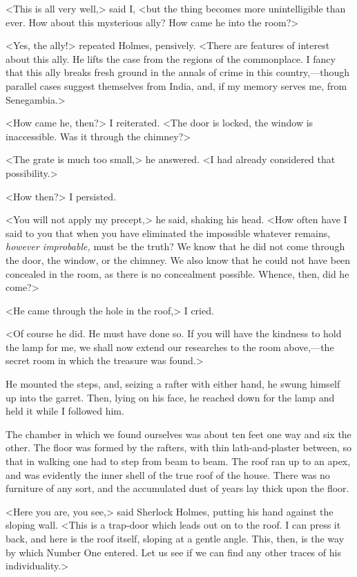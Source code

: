 <This is all very well,> said I, <but the thing becomes more unintelligible than ever. How about this mysterious ally? How came he into the room?>

<Yes, the ally!> repeated Holmes, pensively. <There are features of interest about this ally. He lifts the case from the regions of the commonplace. I fancy that this ally breaks fresh ground in the annals of crime in this country,—though parallel cases suggest themselves from India, and, if my memory serves me, from Senegambia.>

<How came he, then?> I reiterated. <The door is locked, the window is inaccessible. Was it through the chimney?>

<The grate is much too small,> he answered. <I had already considered that possibility.>

<How then?> I persisted.

<You will not apply my precept,> he said, shaking his head. <How often have I said to you that when you have eliminated the impossible whatever remains, \textit{however improbable,} must be the truth? We know that he did not come through the door, the window, or the chimney. We also know that he could not have been concealed in the room, as there is no concealment possible. Whence, then, did he come?>

<He came through the hole in the roof,> I cried.

<Of course he did. He must have done so. If you will have the kindness to hold the lamp for me, we shall now extend our researches to the room above,—the secret room in which the treasure was found.>

He mounted the steps, and, seizing a rafter with either hand, he swung himself up into the garret. Then, lying on his face, he reached down for the lamp and held it while I followed him.

The chamber in which we found ourselves was about ten feet one way and six the other. The floor was formed by the rafters, with thin lath-and-plaster between, so that in walking one had to step from beam to beam. The roof ran up to an apex, and was evidently the inner shell of the true roof of the house. There was no furniture of any sort, and the accumulated dust of years lay thick upon the floor.

<Here you are, you see,> said Sherlock Holmes, putting his hand against the sloping wall. <This is a trap-door which leads out on to the roof. I can press it back, and here is the roof itself, sloping at a gentle angle. This, then, is the way by which Number One entered. Let us see if we can find any other traces of his individuality.>

